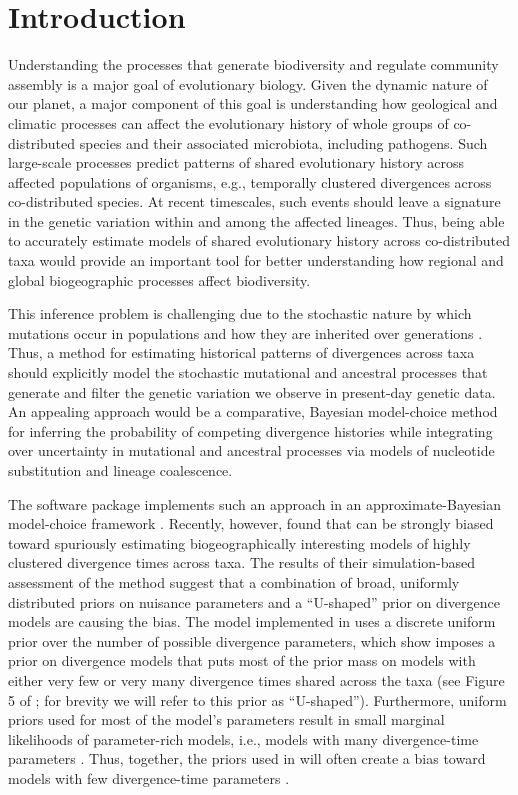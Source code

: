 \section*{Introduction}
Understanding the processes that generate biodiversity and regulate
community assembly is a major goal of evolutionary biology.
Given the dynamic nature of our planet, a major component of this goal is
understanding how geological and climatic processes can affect the
evolutionary history of whole groups of co-distributed species and their
associated microbiota, including pathogens.
Such large-scale processes predict patterns of shared evolutionary history
across affected populations of organisms, e.g., temporally clustered
divergences across co-distributed species.
At recent timescales, such events should leave a signature in the genetic
variation within and among the affected lineages.
Thus, being able to accurately estimate models of shared evolutionary
history across co-distributed taxa would provide an important
tool for better understanding how regional and global biogeographic
processes affect biodiversity.

This inference problem is challenging due to the stochastic nature by which
mutations occur in populations and how they are inherited over generations
\citep{Hudson1990,WakeleyCoalescent}.
Thus, a method for estimating historical patterns of divergences across taxa
should explicitly model the stochastic mutational and ancestral processes that
generate and filter the genetic variation we observe in present-day genetic
data.
An appealing approach would be a comparative, Bayesian model-choice method for
inferring the probability of competing divergence histories while integrating
over uncertainty in mutational and ancestral processes via models of nucleotide
substitution and lineage coalescence.

The software package \msb implements such an approach in an
approximate-Bayesian model-choice framework \citep{Hickerson2006,Huang2011}.
Recently, however, \citet{Oaks2012} found that \msb can be strongly biased
toward spuriously estimating biogeographically interesting models of highly
clustered divergence times across taxa.
The results of their simulation-based assessment of the method suggest that a
combination of broad, uniformly distributed priors on nuisance parameters and a
``U-shaped'' prior on divergence models are causing the bias.
The model implemented in \msb uses a discrete uniform prior over the number of
possible divergence parameters, which \citet{Oaks2012} show imposes a prior on
divergence models that puts most of the prior mass on models with either very
few or very many divergence times shared across the taxa (see Figure 5 of
\citet{Oaks2012}; for brevity we will refer to this prior as ``U-shaped'').
Furthermore, uniform priors used for most of the model's parameters
result in small marginal likelihoods of parameter-rich models, i.e., models
with many divergence-time parameters \citep{Jeffreys1935, Lindley1957}.
Thus, together, the priors used in \msb will often create a bias toward
models with few divergence-time parameters \citep{Oaks2012}.

